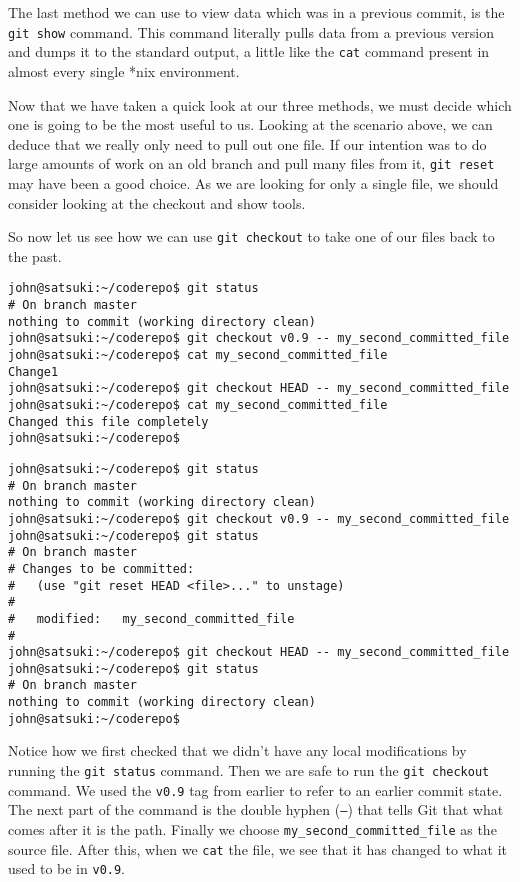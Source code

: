 The last method we can use to view data which was in a previous commit, is the \texttt{git show} command.  This command literally pulls data from a previous version and dumps it to the standard output, a little like the \texttt{cat} command present in almost every single *nix environment.

Now that we have taken a quick look at our three methods, we must decide which one is going to be the most useful to us.  Looking at the scenario above, we can deduce that we really only need to pull out one file.  If our intention was to do large amounts of work on an old branch and pull many files from it, \texttt{git reset} may have been a good choice.  As we are looking for only a single file, we should consider looking at the checkout and show tools.

So now let us see how we can use \texttt{git checkout} to take one of our files back to the past.

\begin{Verbatim}[frame=leftline,framerule=1mm,fontsize=\relsize{-3}] 
john@satsuki:~/coderepo$ git status
# On branch master
nothing to commit (working directory clean)
john@satsuki:~/coderepo$ git checkout v0.9 -- my_second_committed_file
john@satsuki:~/coderepo$ cat my_second_committed_file 
Change1
john@satsuki:~/coderepo$ git checkout HEAD -- my_second_committed_file
john@satsuki:~/coderepo$ cat my_second_committed_file 
Changed this file completely
john@satsuki:~/coderepo$ 
\end{Verbatim}

\begin{Verbatim}[frame=leftline,framerule=1mm,fontsize=\relsize{-3}] 
john@satsuki:~/coderepo$ git status
# On branch master
nothing to commit (working directory clean)
john@satsuki:~/coderepo$ git checkout v0.9 -- my_second_committed_file
john@satsuki:~/coderepo$ git status
# On branch master
# Changes to be committed:
#   (use "git reset HEAD <file>..." to unstage)
#
#	modified:   my_second_committed_file
#
john@satsuki:~/coderepo$ git checkout HEAD -- my_second_committed_file
john@satsuki:~/coderepo$ git status
# On branch master
nothing to commit (working directory clean)
john@satsuki:~/coderepo$ 
\end{Verbatim}

Notice how we first checked that we didn't have any local modifications by running the \texttt{git status} command.  Then we are safe to run the \texttt{git checkout} command.  We used the \texttt{v0.9} tag from earlier to refer to an earlier commit state.  The next part of the command is the double hyphen (\texttt{--}) that tells Git that what comes after it is the path.  Finally we choose \texttt{my\_second\_committed\_file} as the source file.  After this, when we \texttt{cat} the file, we see that it has changed to what it used to be in \texttt{v0.9}.

